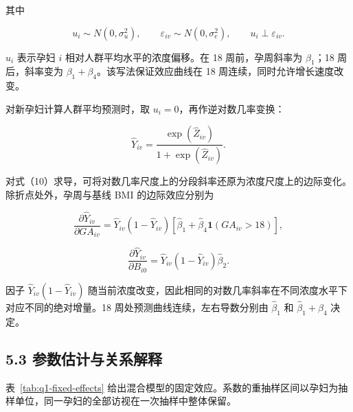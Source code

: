 \documentclass[UTF8,fontset=fandol,zihao=-4,a4paper]{ctexart}
\begin{document}
其中

\[
u_i\sim N(0,\sigma_u^2),
\qquad
\varepsilon_{iv}\sim N(0,\sigma_e^2),
\qquad
u_i\perp\varepsilon_{iv}.
\tag{9}
\]

\(u_i\) 表示孕妇 \(i\) 相对人群平均水平的浓度偏移。在 18
周前，孕周斜率为 \(\beta_1\)；18 周后，斜率变为
\(\beta_1+\beta_4\)。该写法保证效应曲线在 18
周连续，同时允许增长速度改变。

对新孕妇计算人群平均预测时，取 \(u_i=0\)，再作逆对数几率变换：

\[
\widehat Y_{iv}
=\frac{\exp(\widehat Z_{iv})}
{1+\exp(\widehat Z_{iv})}.
\tag{10}
\]

对式（10）求导，可将对数几率尺度上的分段斜率还原为浓度尺度上的边际变化。除折点处外，孕周与基线
BMI 的边际效应分别为

\[
\frac{\partial \widehat Y_{iv}}{\partial GA_{iv}}
=\widehat Y_{iv}(1-\widehat Y_{iv})
\left[\widehat\beta_1+
\widehat\beta_4\mathbf 1(GA_{iv}>18)\right],
\tag{10a}
\]

\[
\frac{\partial \widehat Y_{iv}}{\partial B_{i0}}
=\widehat Y_{iv}(1-\widehat Y_{iv})\widehat\beta_2.
\tag{10b}
\]

因子 \(\widehat Y_{iv}(1-\widehat Y_{iv})\)
随当前浓度改变，因此相同的对数几率斜率在不同浓度水平下对应不同的绝对增量。18
周处预测曲线连续，左右导数分别由 \(\widehat\beta_1\) 和
\(\widehat\beta_1+\widehat\beta_4\) 决定。

\subsection{5.3
参数估计与关系解释}\label{ux53c2ux6570ux4f30ux8ba1ux4e0eux5173ux7cfbux89e3ux91ca}

表~\ref{tab:q1-fixed-effects}
给出混合模型的固定效应。系数的重抽样区间以孕妇为抽样单位，同一孕妇的全部访视在一次抽样中整体保留。
\end{document}
